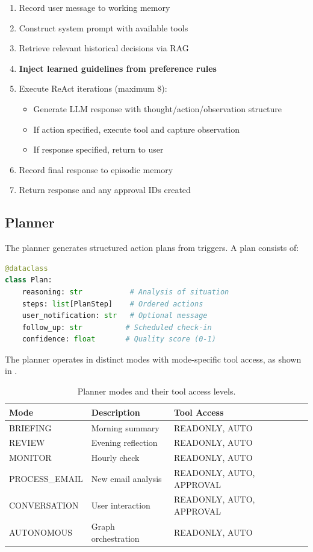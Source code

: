 \documentclass[11pt,a4paper]{article}
\begin{document}
\begin{enumerate}
    \item Record user message to working memory
    \item Construct system prompt with available tools
    \item Retrieve relevant historical decisions via RAG
    \item \textbf{Inject learned guidelines from preference rules}
    \item Execute ReAct iterations (maximum 8):
    \begin{itemize}
        \item Generate LLM response with thought/action/observation structure
        \item If action specified, execute tool and capture observation
        \item If response specified, return to user
    \end{itemize}
    \item Record final response to episodic memory
    \item Return response and any approval IDs created
\end{enumerate}

\subsection{Planner}

The planner generates structured action plans from triggers. A plan consists of:

\begin{lstlisting}[language=Python]
@dataclass
class Plan:
    reasoning: str           # Analysis of situation
    steps: list[PlanStep]    # Ordered actions
    user_notification: str   # Optional message
    follow_up: str          # Scheduled check-in
    confidence: float       # Quality score (0-1)
\end{lstlisting}

The planner operates in distinct modes with mode-specific tool access, as shown in .

\begin{table}[t]
\centering
\caption{Planner modes and their tool access levels.}
\label{tab:modes}
\begin{tabular}{lll}
\toprule
\textbf{Mode} & \textbf{Description} & \textbf{Tool Access} \\
\midrule
BRIEFING & Morning summary & READONLY, AUTO \\
REVIEW & Evening reflection & READONLY, AUTO \\
MONITOR & Hourly check & READONLY, AUTO \\
PROCESS\_EMAIL & New email analysis & READONLY, AUTO, APPROVAL \\
CONVERSATION & User interaction & READONLY, AUTO, APPROVAL \\
AUTONOMOUS & Graph orchestration & READONLY, AUTO \\
\bottomrule
\end{tabular}
\end{table}
\end{document}
